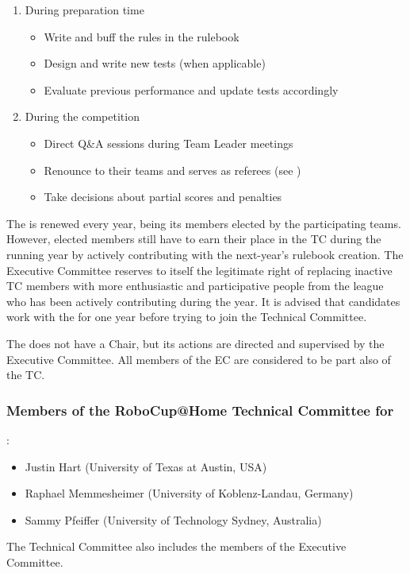 \begin{enumerate}
  \item During preparation time
  \begin{itemize}
    \item Write and buff the rules in the rulebook
    \item Design and write new tests (when applicable)
    \item Evaluate previous performance and update tests accordingly
  \end{itemize}
  \item During the competition
  \begin{itemize}
    \item Direct Q\&A sessions during Team Leader meetings
    \item Renounce to their teams and serves as referees (see )
    \item Take decisions about partial scores and penalties
  \end{itemize}
\end{enumerate}

The  is renewed every year, being its members elected by the participating teams. However, elected members still have to earn their place in the TC during the running year by actively contributing with the next-year's rulebook creation. The Executive Committee reserves to itself the legitimate right of replacing inactive TC members with more enthusiastic and participative people from the league who has been actively contributing during the year. It is advised that candidates work with the  for one year before trying to join the Technical Committee.

The  does not have a Chair, but its actions are directed and supervised by the Executive Committee. All members of the EC are considered to be part also of the TC.

\subsubsection{Members of the RoboCup@Home Technical Committee for \YEAR}:
\begin{itemize}
  \item Justin Hart (University of Texas at Austin, USA)
  \item Raphael Memmesheimer (University of Koblenz-Landau, Germany)
  \item Sammy Pfeiffer (University of Technology Sydney, Australia)
\end{itemize}
The Technical Committee also includes the members of the Executive Committee.


